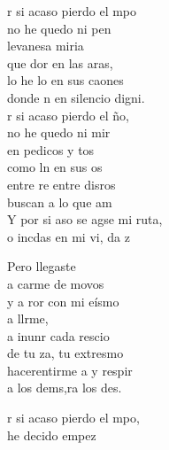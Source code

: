 \begin{cancion}%
	r si acaso pierdo el mpo \\
	no he quedo ni pen \\
	levanesa miria \\
	que dor en las aras, \\
	lo he lo en sus caones \\
	donde n en silencio digni. \\
	r si acaso pierdo el ño, \\
	no he quedo ni mir\\
	en pedicos y tos\\
	como ln en sus os \\
	entre re entre disros\\
	buscan  a lo que am \\
	Y por si aso se agse mi ruta,\\
	o incdas en mi vi, da z\\
	\begin{chorus}%
	Pero llegaste   \\
	a carme de movos\\
	y a ror con mi eísmo\\
	a llrme, \\
	a inunr cada rescio\\
	de tu za, tu extresmo \\
	hacerentirme a y respir \\
	a los dems,ra los des. \\
	\end{chorus}%
	r si acaso pierdo el mpo, \\
	he decido empez\\

\end{cancion}
